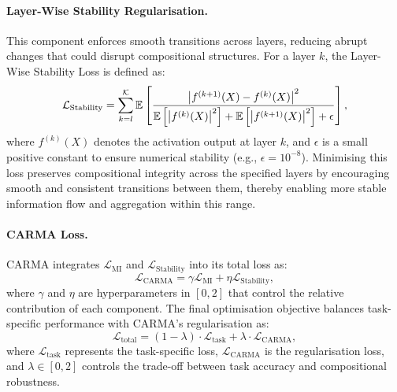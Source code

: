 \paragraph{Layer-Wise Stability Regularisation.}
This component enforces smooth transitions across layers, reducing abrupt changes that could disrupt compositional structures. For a layer \( k \), the Layer-Wise Stability Loss is defined as:
\begin{equation}
\small
\mathcal{L}_{\text{Stability}} = \sum_{k=l}^{\mathcal{K}} \mathbb{E} \left[ \frac{\left| f^{(k+1)}(X) - f^{(k)}(X) \right|^2}{\mathbb{E}\left[ \left| f^{(k)}(X) \right|^2 \right] + \mathbb{E}\left[ \left| f^{(k+1)}(X) \right|^2 \right] + \epsilon} \right],
\end{equation}
where \( f^{(k)}(X) \) denotes the activation output at layer \( k \), and \( \epsilon \) is a small positive constant to ensure numerical stability (e.g., \( \epsilon = 10^{-8} \)). Minimising this loss preserves compositional integrity across the specified layers by encouraging smooth and consistent transitions between them, thereby enabling more stable information flow and aggregation within this range.

\paragraph{CARMA Loss.} CARMA integrates $\mathcal{L}_{\text{MI}}$ and $\mathcal{L}_{\text{Stability}}$ into its total loss as:
\begin{equation}\label{eq:carma_loss}
\mathcal{L}_{\text{CARMA}} = \gamma \mathcal{L}_{\text{MI}} + \eta \mathcal{L}_{\text{Stability}},
\end{equation}
where \( \gamma \) and \( \eta \) are hyperparameters in \( [0, 2] \) that control the relative contribution of each component. The final optimisation objective balances task-specific performance with CARMA’s regularisation as:
\begin{equation}
    \mathcal{L}_{\text{total}} = (1 - \lambda) \cdot \mathcal{L}_{\text{task}} + \lambda \cdot \mathcal{L}_{\text{CARMA}},
\end{equation}
where \( \mathcal{L}_{\text{task}} \) represents the task-specific loss, \( \mathcal{L}_{\text{CARMA}} \) is the regularisation loss, and \( \lambda \in [0, 2] \) controls the trade-off between task accuracy and compositional robustness.
